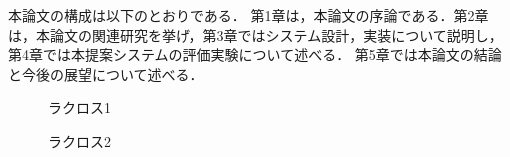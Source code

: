 \documentclass[sotsuron]{kuee}
\begin{document}
	本論文の構成は以下のとおりである．
	第1章は，本論文の序論である．第2章は，本論文の関連研究を挙げ，第3章ではシステム設計，実装について説明し，第4章では本提案システムの評価実験について述べる．
	第5章では本論文の結論と今後の展望について述べる．
		\begin{figure}
			\begin{center}
			\end{center}
			\caption{ラクロス1}
	  		\label{fig:lax001}
		\end{figure}
		\begin{figure}
			\begin{center}
			\end{center}
			\caption{ラクロス2}
	  		\label{fig:lax002}
		\end{figure}
\end{document}
